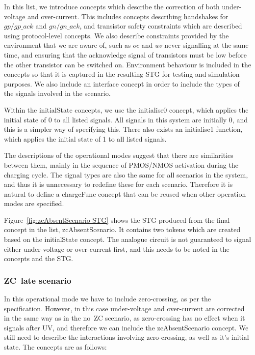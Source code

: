 \documentclass[british,compsoc]{IEEEtran}
\begin{document}
In this list, we introduce concepts which describe the correction
of both under-voltage and over-current. This includes concepts describing
handshakes for $gp/gp\_ack$ and $gn/gn\_ack$, and transistor safety
constraints which are described using protocol-level concepts. We
also describe constraints provided by the environment that we are
aware of, such as $oc$ and $uv$ never signalling at the same time, and ensuring that
the acknowledge signal of transistors must be low before the other transistor can be switched on.
Environment behaviour is included in the concepts so that it is captured in the resulting STG for testing and simulation purposes.
We also include an \textsf{interface} concept in order to include the
types of the signals involved in the scenario.

Within the \textsf{initialState} concepts, we use the \textsf{initialise0} concept, which applies the initial state of 0 to all listed signals.
All signals in this system are initially 0, and this is a simpler way of specifying this. There also exists an \textsf{initialise1} function, which
applies the initial state of 1 to all listed signals.

The descriptions of the operational modes suggest that there are similarities
between them, mainly in the sequence of PMOS/NMOS activation during
the charging cycle. The signal types are also the same for all scenarios in the system, and
thus it is unnecessary to redefine these for each scenario.
Therefore it is natural to define a \textsf{chargeFunc}
concept that can be reused when other operation modes are specified.


Figure~\ref{fig:zcAbsentScenario STG} shows the STG produced from
the final concept in the list, \textsf{zcAbsentScenario}. It contains
two tokens which are created based on the \textsf{initialState} concept.
The analogue circuit is not guaranteed to signal either under-voltage
or over-current first, and this needs to be noted in the concepts
and the STG.

\subsubsection{ZC~late scenario}

In this operational mode we have to include zero-crossing, as per
the specification. However, in this case under-voltage and over-current
are corrected in the same way as in the no~ZC scenario, as zero-crossing has no effect when it signals after UV, and therefore
we can include the \textsf{zcAbsentScenario} concept. We still need
to describe the interactions involving zero-crossing, as well as it's initial state. The concepts
are as follows:
\end{document}

